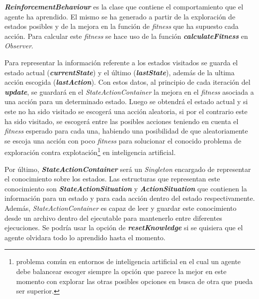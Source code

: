 \textbf{\textit{ReinforcementBehaviour}} es la clase que contiene el comportamiento que el agente ha aprendido. El mismo se ha generado a partir de la exploración de estados posibles y de la mejora en la función de \textit{fitness} que ha supuesto cada acción. Para calcular este \textit{fitness} se hace uso de la función \textbf{\textit{calculateFitness}} en \textit{Observer}.

\bigskip

Para representar la información referente a los estados visitados se guarda el estado actual (\textbf{\textit{currentState}}) y el último (\textbf{\textit{lastState}}), además de la ultima acción escogida (\textbf{\textit{lastAction}}). Con estos datos, al principio de cada iteración del \textbf{\textit{update}}, se guardará en el \textit{StateActionContainer} la mejora en el \textit{fitness} asociada a una acción para un determinado estado. Luego se obtendrá el estado actual y si este no ha sido visitado se escogerá una acción aleatoria, si por el contrario este ha sido visitado, se escogerá entre las posibles acciones teniendo en cuenta el \textit{fitness} esperado para cada una, habiendo una posibilidad de que aleatoriamente se escoja una acción con poco \textit{fitness} para solucionar el conocido problema de exploración contra explotación\footnote{problema común en entornos de inteligencia artificial en el cual un agente debe balancear escoger siempre la opción que parece la mejor en este momento con explorar las otras posibles opciones en busca de otra que pueda ser superior.} en inteligencia artificial.

\bigskip

Por último, \textbf{\textit{StateActionContainer}} será un \textit{Singleton} encargado de representar el conocimiento sobre los estados. Las estructuras que representan este conocimiento son \textbf{\textit{StateActionSituation}} y \textbf{\textit{ActionSituation}} que contienen la información para un estado y para cada acción dentro del estado respectivamente. Además, \textit{StateActionContainer} es capaz de leer y guardar este conocimiento desde un archivo dentro del ejecutable para mantenerlo entre diferentes ejecuciones. Se podría usar la opción de \textbf{\textit{resetKnowledge}} si se quisiera que el agente olvidara todo lo aprendido hasta el momento.


